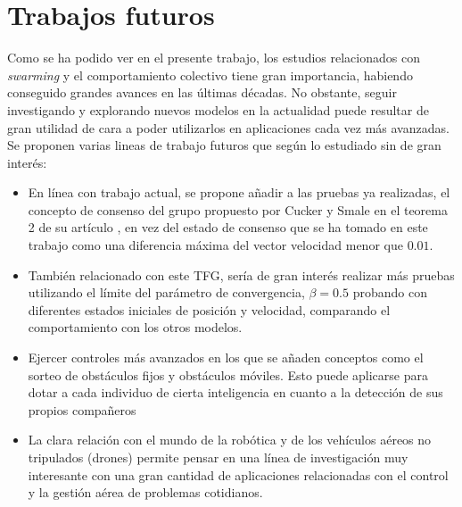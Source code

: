 \section{Trabajos futuros} \label{s5_2}
Como se ha podido ver en el presente trabajo, los estudios relacionados con \textit{swarming} y el comportamiento colectivo tiene gran importancia, habiendo conseguido grandes avances en las últimas décadas. No obstante, seguir investigando y explorando nuevos modelos en la actualidad puede resultar de gran utilidad de cara a poder utilizarlos en aplicaciones cada vez más avanzadas. Se proponen varias lineas de trabajo futuros que según lo estudiado sin de gran interés:
\begin{itemize}
    \item En línea con trabajo actual, se propone añadir a las pruebas ya realizadas, el concepto de consenso del grupo propuesto por Cucker y Smale en el teorema 2 de su artículo \cite{cucker2007mathematics}, en vez del estado de consenso que se ha tomado en este trabajo como una diferencia máxima del vector velocidad menor que $0.01$. 
    \item También relacionado con este TFG, sería de gran interés realizar más pruebas utilizando el límite del parámetro de convergencia, $\beta = 0.5$ probando con diferentes estados iniciales de posición y velocidad, comparando el comportamiento con los otros modelos.
    \item Ejercer controles más avanzados en los que se añaden conceptos como el sorteo de obstáculos fijos y obstáculos móviles. Esto puede aplicarse para dotar a cada individuo de cierta inteligencia en cuanto a la detección de sus propios compañeros \cite{alejo2014optimal, berg2011reciprocal, van2008reciprocal}
    \item La clara relación con el mundo de la robótica y de los vehículos aéreos no tripulados (drones) permite pensar en una línea de investigación muy interesante con una gran cantidad de aplicaciones relacionadas con el control y la gestión aérea de problemas cotidianos. 
    
\end{itemize}
